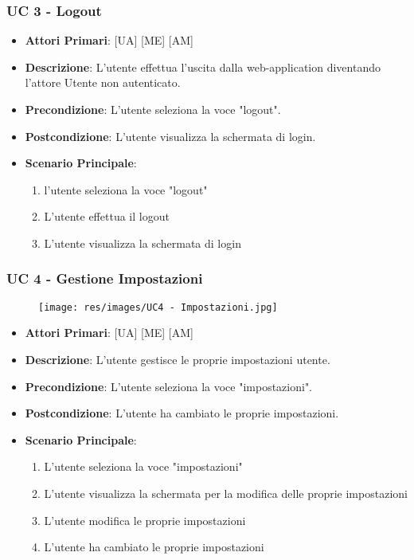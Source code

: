 		\subsubsection{UC 3 - Logout}
		\begin{itemize}
			\item \textbf{Attori Primari}: [UA] [ME] [AM]
			\item \textbf{Descrizione}: L'utente effettua l'uscita dalla web-application diventando l'attore Utente non autenticato.
			\item \textbf{Precondizione}: L'utente seleziona la voce "logout".
			\item \textbf{Postcondizione}: L'utente visualizza la schermata di login.
			\item \textbf{Scenario Principale}:
			\begin{enumerate}
				\item{l'utente seleziona la voce "logout"}
				\item{L'utente effettua il logout}
				\item{L'utente visualizza la schermata di login}
			\end{enumerate}	
		\end{itemize}

		\subsubsection{UC 4 - Gestione Impostazioni}
		
		\begin{figure}[H]
			\centering
			\texttt{[image: res/images/UC4 - Impostazioni.jpg]}
		\end{figure}
		
		\begin{itemize}
			\item \textbf{Attori Primari}: [UA] [ME] [AM]
			\item \textbf{Descrizione}: L'utente gestisce le proprie impostazioni utente.
			\item \textbf{Precondizione}: L'utente seleziona la voce "impostazioni".
			\item \textbf{Postcondizione}: L'utente ha cambiato le proprie impostazioni.
			\item \textbf{Scenario Principale}:
			\begin{enumerate}
				\item{L'utente seleziona la voce "impostazioni"}
				\item{L'utente visualizza la schermata per la modifica delle proprie impostazioni}
				\item{L'utente modifica le proprie impostazioni}
				\item{L'utente ha cambiato le proprie impostazioni}
			\end{enumerate}	
		\end{itemize}
			

